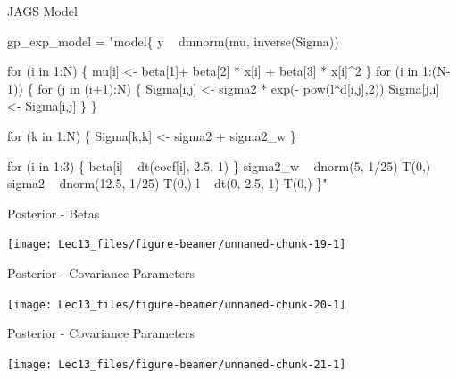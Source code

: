 \documentclass[11pt,ignorenonframetext,]{beamer}
\newenvironment{Shaded}{}{}
\newcommand{\NormalTok}[1]{#1}
\newcommand{\StringTok}[1]{\textcolor[rgb]{0.25,0.44,0.63}{#1}}
\let\oldShaded\Shaded
\let\endoldShaded\endShaded
\renewenvironment{Shaded}{\footnotesize\begin{spacing}{0.9}\oldShaded}{\endoldShaded\end{spacing}}
\let\oldverbatim\verbatim
\let\endoldverbatim\endverbatim
\newcommand{\scriptoutput}{
  \renewenvironment{Shaded}{\scriptsize\begin{spacing}{0.9}\oldShaded}{\endoldShaded\end{spacing}}
  \renewenvironment{verbatim}{\scriptsize\begin{spacing}{0.9}\oldverbatim}{\endoldverbatim\end{spacing}}
}
\begin{document}
\begin{frame}[fragile]{JAGS Model}
\protect\hypertarget{jags-model}{}

\scriptoutput

\begin{Shaded}
\begin{Highlighting}[]
\NormalTok{gp_exp_model =}\StringTok{ "model\{}
\StringTok{  y ~ dmnorm(mu, inverse(Sigma))}

\StringTok{  for (i in 1:N) \{}
\StringTok{    mu[i] <- beta[1]+ beta[2] * x[i] + beta[3] * x[i]^2}
\StringTok{  \}}
\StringTok{  }
\StringTok{  for (i in 1:(N-1)) \{}
\StringTok{    for (j in (i+1):N) \{}
\StringTok{      Sigma[i,j] <- sigma2 * exp(- pow(l*d[i,j],2))}
\StringTok{      Sigma[j,i] <- Sigma[i,j]}
\StringTok{    \}}
\StringTok{  \}}

\StringTok{  for (k in 1:N) \{}
\StringTok{    Sigma[k,k] <- sigma2 + sigma2_w}
\StringTok{  \}}

\StringTok{  for (i in 1:3) \{}
\StringTok{    beta[i] ~ dt(coef[i], 2.5, 1)}
\StringTok{  \}}
\StringTok{  sigma2_w ~ dnorm(5, 1/25) T(0,)}
\StringTok{  sigma2   ~ dnorm(12.5, 1/25) T(0,)}
\StringTok{  l        ~ dt(0, 2.5, 1) T(0,) }
\StringTok{\}"}
\end{Highlighting}
\end{Shaded}

\end{frame}

\begin{frame}{Posterior - Betas}
\protect\hypertarget{posterior---betas}{}

\begin{center}\texttt{[image: Lec13\_files/figure-beamer/unnamed-chunk-19-1]} \end{center}

\end{frame}

\begin{frame}{Posterior - Covariance Parameters}
\protect\hypertarget{posterior---covariance-parameters}{}

\begin{center}\texttt{[image: Lec13\_files/figure-beamer/unnamed-chunk-20-1]} \end{center}

\end{frame}

\begin{frame}{Posterior - Covariance Parameters}
\protect\hypertarget{posterior---covariance-parameters-1}{}

\begin{center}\texttt{[image: Lec13\_files/figure-beamer/unnamed-chunk-21-1]} \end{center}

\end{frame}
\end{document}
